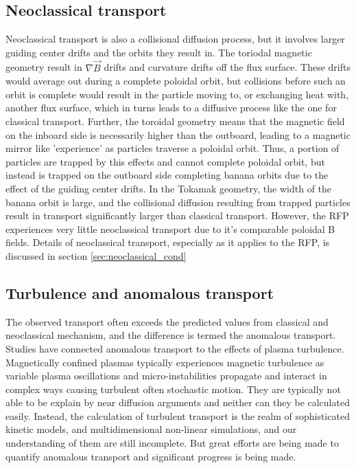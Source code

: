 \begin{refsection}
\subsection{Neoclassical transport}

Neoclassical transport is also a collisional diffusion process, but it involves larger guiding center drifts and the orbits they result in. The toriodal magnetic geometry result in $\nabla\vec{B}$ drifts and curvature drifts off the flux surface. These drifts would average out during a complete poloidal orbit, but collisions before such an orbit is complete would result in the particle moving to, or exchanging heat with, another flux surface, which in turns leads to a diffusive process like the one for classical transport. Further, the toroidal geometry means that the magnetic field on the inboard side is necessarily higher than the outboard, leading to a magnetic mirror like 'experience' as particles traverse a poloidal orbit. Thus, a portion of particles are trapped by this effects and cannot complete poloidal orbit, but instead is trapped on the outboard side completing banana orbits due to the effect of the guiding center drifts. In the Tokamak geometry, the width of the banana orbit is large, and the collisional diffusion resulting from trapped particles result in transport significantly larger than classical transport. However, the RFP experiences very little neoclassical transport due to it's comparable poloidal B fields. Details of neoclassical transport, especially as it applies to the RFP, is discussed in section \ref{sec:neoclassical_cond}

\subsection{Turbulence and anomalous transport}

The observed transport often exceeds the predicted values from classical and neoclassical mechanism, and the difference is termed the anomalous transport. Studies have connected anomalous transport to the effects of plasma turbulence. Magnetically confined plasmas typically experiences magnetic turbulence as variable plasma oscillations and micro-instabilities propagate and interact in complex ways causing turbulent often stochastic motion. They are typically not able to be explain by near diffusion arguments and neither can they be calculated easily. Instead, the calculation of turbulent transport is the realm of sophisticated kinetic models, and multidimensional non-linear simulations, and our understanding of them are still incomplete. But great efforts are being made to quantify anomalous transport and significant progress is being made.


\end{refsection}
